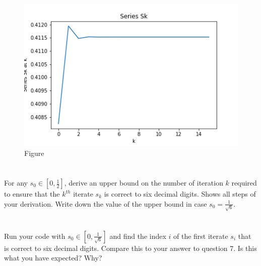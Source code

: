 \documentclass{article}
\begin{document}
\begin{figure}[H]
    \centering
    \includegraphics[width = .7\linewidth]{hw01q05.png}
    \caption{Figure}
    \label{fig:my_label}
\end{figure}

\section{}
For any $s_0 \in \left[0, \frac{1}{2} \right]$, derive an upper bound on the number of iteration $k$ required to ensure that the $k^{th}$ iterate $s_k$ is correct to six decimal digits. Shows all steps of your derivation. Write down the value of the upper bound in case $s_0 = \frac{1}{\sqrt{6}}$.
\vspace{10mm}

\section{}
Run your code with $s_0 \in \left[0,\frac{1}{\sqrt{6}} \right]$ and find the index $i$ of the first iterate $s_i$ that is correct to six decimal digits. Compare this to your answer to question 7. Is this what you have expected? Why?
\vspace{10mm}
\end{document}
